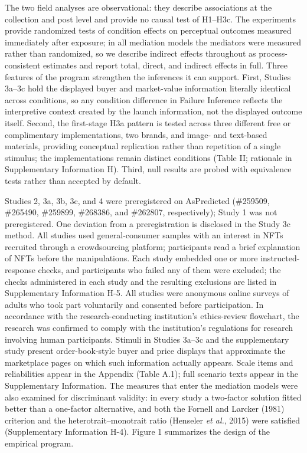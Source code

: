 \documentclass[12pt, a4paper]{article}
\begin{document}
The two field analyses are observational: they describe associations at the collection and post level and provide no causal test of H1--H3c. The experiments provide randomized tests of condition effects on perceptual outcomes measured immediately after exposure; in all mediation models the mediators were measured rather than randomized, so we describe indirect effects throughout as process-consistent estimates and report total, direct, and indirect effects in full. Three features of the program strengthen the inferences it can support. First, Studies 3a--3c hold the displayed buyer and market-value information literally identical across conditions, so any condition difference in Failure Inference reflects the interpretive context created by the launch information, not the displayed outcome itself. Second, the first-stage H3a pattern is tested across three different free or complimentary implementations, two brands, and image- and text-based materials, providing conceptual replication rather than repetition of a single stimulus; the implementations remain distinct conditions (Table II; rationale in Supplementary Information H). Third, null results are probed with equivalence tests rather than accepted by default.

Studies 2, 3a, 3b, 3c, and 4 were preregistered on AsPredicted (\#259509, \#265490, \#259899, \#268386, and \#262807, respectively); Study 1 was not preregistered. One deviation from a preregistration is disclosed in the Study 3c method. All studies used general-consumer samples with an interest in NFTs recruited through a crowdsourcing platform; participants read a brief explanation of NFTs before the manipulations. Each study embedded one or more instructed-response checks, and participants who failed any of them were excluded; the checks administered in each study and the resulting exclusions are listed in Supplementary Information H-5. All studies were anonymous online surveys of adults who took part voluntarily and consented before participation. In accordance with the research-conducting institution's ethics-review flowchart, the research was confirmed to comply with the institution's regulations for research involving human participants. Stimuli in Studies 3a--3c and the supplementary study present order-book-style buyer and price displays that approximate the marketplace pages on which such information actually appears. Scale items and reliabilities appear in the Appendix (Table A.1); full scenario texts appear in the Supplementary Information. The measures that enter the mediation models were also examined for discriminant validity: in every study a two-factor solution fitted better than a one-factor alternative, and both the Fornell and Larcker (1981) criterion and the heterotrait--monotrait ratio (Henseler \emph{et al.}, 2015) were satisfied (Supplementary Information H-4). Figure 1 summarizes the design of the empirical program.
\end{document}
